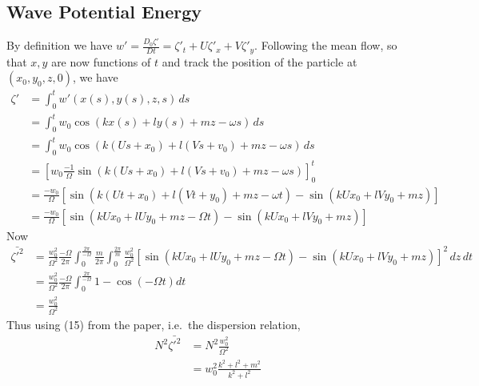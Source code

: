 \documentclass[12pt]{article}
\begin{document}
\subsection{Wave Potential Energy}
By definition we have $w' = \frac{D_0 \zeta'}{D t} = \zeta'_t + U\zeta'_x + V\zeta'_y$. Following the mean flow, so that $x,y$ are now functions of $t$ and track the position of the particle at $(x_0,y_0,z,0)$, we have
\begin{align*}
\zeta' &= \int_{0}^t w'(x(s),y(s),z,s)\,ds \\
&= \int_{0}^t w_0 \cos(k x(s) + l y(s) + mz - \omega s)\,ds \\
&= \int_{0}^t w_0  \cos(k (Us + x_0) + l (Vs+v_0) + mz - \omega s)\,ds \\
&= \left[ w_0 \frac{-1}{\Omega} \sin(k (Us + x_0) + l (Vs+v_0) + mz - \omega s)\right]_{0}^t \\
&= \frac{-w_0 }{\Omega} \left[\sin(k (Ut +x_0) + l (Vt + y_0) + mz - \omega t) - \sin(kU x_0 + lVy_0 + mz) \right] \\
&= \frac{-w_0 }{\Omega} \left[\sin(kUx_0 + lUy_0 + mz - \Omega t) - \sin(kU x_0 + lVy_0 + mz) \right] 
\end{align*}
Now
\begin{align*}
\bar{\zeta'^2} &= \frac{w_0^2}{\Omega^2}\frac{-\Omega}{2\pi} \int_0^{\frac{2\pi}{-\Omega}} \frac{m}{2\pi} \int_0^\frac{2\pi}{m} \frac{w_0 ^2}{\Omega ^2} \left[\sin(kUx_0 + lUy_0 + mz - \Omega t) - \sin(kU x_0 + lVy_0 + mz) \right]^2\, dz\, dt \\
&= \frac{w_0^2}{\Omega^2} \frac{-\Omega}{2\pi} \int_0^{\frac{2\pi}{-\Omega}} 1 - \cos(-\Omega t) dt \\
&= \frac{w_0^2}{\Omega^2}
\end{align*}
Thus using (15) from the paper, i.e.~the dispersion relation,
\begin{align*}
N^2 \bar{\zeta'^2} &= N^2 \frac{w_0^2}{\Omega^2} \\
&= w_0^2 \frac{k^2 + l^2 + m^2}{k^2 + l^2}
\end{align*}
\end{document}
